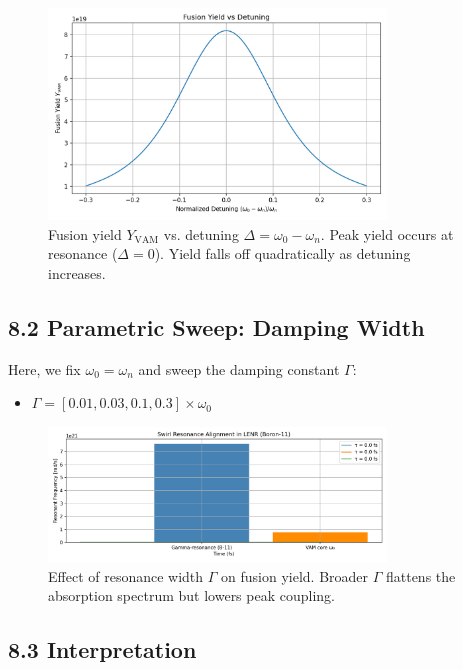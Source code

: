 \begin{figure}[h!]
  \centering
  \includegraphics[width=0.8\textwidth]{../images/Appendix_BeamSwirlInteractionSpectrumImage6}
  \caption{Fusion yield $Y_{\mathrm{VAM}}$ vs. detuning $\Delta = \omega_0 - \omega_n$. Peak yield occurs at resonance (\(\Delta = 0\)). Yield falls off quadratically as detuning increases.}
\end{figure}

\subsection*{8.2 Parametric Sweep: Damping Width}

Here, we fix $\omega_0 = \omega_n$ and sweep the damping constant $\Gamma$:

\begin{itemize}
  \item $\Gamma = [0.01, 0.03, 0.1, 0.3] \times \omega_0$
\end{itemize}

\begin{figure}[h!]
  \centering
  \includegraphics[width=0.8\textwidth]{../images/Appendix_BeamSwirlInteractionSpectrumImage5}
  \caption{Effect of resonance width $\Gamma$ on fusion yield. Broader $\Gamma$ flattens the absorption spectrum but lowers peak coupling.}
\end{figure}

\subsection*{8.3 Interpretation}

